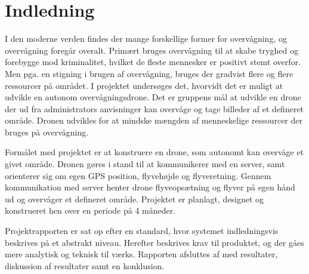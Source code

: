 \chapter{Indledning}
\label{chap:indledning}

I den moderne verden findes der mange forskellige former for overvågning, og overvågning foregår overalt. Primært bruges overvågning til at skabe tryghed og forebygge mod kriminalitet, hvilket de fleste mennesker er positivt stemt overfor. Men pga. en stigning i brugen af overvågning, bruges der gradvist flere og flere ressourcer på området. 
I projektet undersøges det, hvorvidt det er muligt at udvikle en autonom overvågningsdrone. Det er gruppens mål at udvikle en drone der ud fra administrators anvisninger kan overvåge og tage billeder af et defineret område. Dronen udvikles for at mindske mængden af menneskelige ressourcer der bruges på overvågning.

Formålet med projektet er at konstruere en drone, som autonomt kan overvåge et givet område. Dronen gøres i stand til at kommunikerer med en server, samt orienterer sig om egen GPS position, flyvehøjde og flyveretning. Gennem kommunikation med server henter drone flyveopsætning og flyver på egen hånd ud og overvåger et defineret område.
Projektet er planlagt, designet og konstrueret hen over en periode på 4 måneder.

Projektrapporten er sat op efter en standard, hvor systemet indledningsvis beskrives på et abstrakt niveau. Herefter beskrives krav til produktet, og der gåes mere analytisk og teknisk til værks. Rapporten afsluttes af med resultater, diskussion af resultater samt en konklusion.


